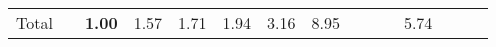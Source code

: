 \begin{tabular}{ll|rrrrrr|rrrrrrr}
  \hline
  Total  & &



  


  
  \textbf{1.00} & 1.57 & 1.71 & 1.94 & 3.16 & 8.95 &  &  &  & 5.74 &  \\


\end{tabular}
